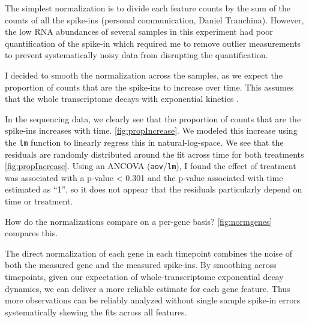 The simplest normalization is to divide each feature counts
by the sum of the counts of all the spike-ins (personal communication,
Daniel Tranchina). However, the low RNA abundances of several 
samples in this experiment had poor quantification of the spike-in 
which required me to remove outlier measurements to prevent 
systematically noisy data from
disrupting the quantification. 

I decided to smooth the normalization across the samples, as we expect
the proportion of counts that are the spike-ins to increase over time.
This assumes that the whole transcriptome decays with exponential
kinetics \parencite{petersen1976half}.

In the sequencing data, we clearly see that the proportion of counts
that are the spike-ins increases with time.
\autoref{fig:propIncrease}.
We modeled this increase using the \texttt{lm} function to linearly
regress this in natural-log-space. We see that
the residuals are randomly distributed around the fit across time 
for both treatments \autoref{fig:propIncrease}.
Using an ANCOVA (\texttt{aov}/\texttt{lm}), I found the effect of 
treatment was associated with a p-value < 0.301 and the p-value
associated with time estimated as ``1'', so it does not appear that the
residuals particularly depend on time or treatment.


How do the normalizations compare on a per-gene basis? 
\ref{fig:normgenes} compares this.



The direct normalization of each gene in each timepoint combines the 
noise of both the measured gene and the measured spike-ins. 
By smoothing across timepoints, 
given our expectation of whole-transcriptome exponential
decay dynamics, we can deliver a more reliable estimate for each gene
feature. Thus more observations can be reliably analyzed
without single sample spike-in errors systematically skewing the fits
across all features.

